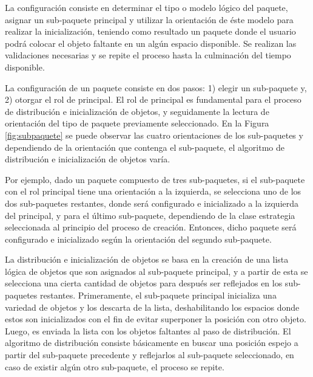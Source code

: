 \documentclass[conference]{IEEEtran}
\begin{document}
La configuración consiste en determinar el tipo o modelo lógico del paquete, asignar un sub-paquete principal y utilizar la orientación de éste modelo para realizar la inicialización, teniendo como resultado un paquete donde el usuario podrá colocar el objeto faltante en un algún espacio disponible. Se realizan las validaciones necesarias y se repite el proceso hasta la culminación del tiempo disponible.

La configuración de un paquete consiste en dos pasos: 1) elegir un sub-paquete y, 2) otorgar el rol de principal. El rol de principal es fundamental para el proceso de distribución e inicialización de objetos, y seguidamente la lectura de orientación del tipo de paquete previamente seleccionado. En la Figura \ref{fig:subpaquete} se puede observar las cuatro orientaciones de los sub-paquetes y dependiendo de la orientación que contenga el sub-paquete, el algoritmo de distribución e inicialización de objetos varía.



Por ejemplo, dado un paquete compuesto de tres sub-paquetes, si el sub-paquete con el rol principal tiene una orientación a la izquierda, se selecciona uno de los dos sub-paquetes restantes, donde será configurado e inicializado a la izquierda del principal, y para el último sub-paquete, dependiendo de la clase estrategia seleccionada al principio del proceso de creación. Entonces, dicho paquete será configurado e inicializado según la orientación del segundo sub-paquete.


La distribución e inicialización de objetos se basa en la creación de una lista lógica de objetos que son asignados al sub-paquete principal, y a partir de esta se selecciona una cierta cantidad de objetos para después ser reflejados en los sub-paquetes restantes. Primeramente, el sub-paquete principal inicializa una variedad de objetos y los descarta de la lista, deshabilitando los espacios donde estos son inicializados con el fin de evitar superponer la posición con otro objeto. Luego, es enviada la lista con los objetos faltantes al paso de distribución. El algoritmo de distribución consiste básicamente en buscar una posición espejo a partir del sub-paquete precedente y reflejarlos al sub-paquete seleccionado, en caso de existir algún otro sub-paquete, el proceso se repite. 
\end{document}
